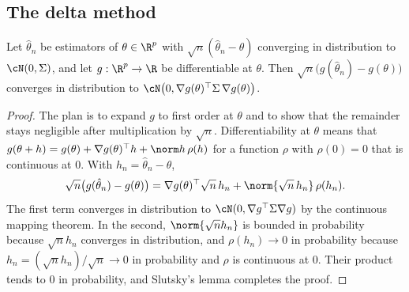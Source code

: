 \begin{refsection}
\section{The delta method}\label{sec:toolkit:delta}

\begin{theorem}\label{thm:toolkit:delta}
Let $\hat\theta_n$ be estimators of $\theta\in\R^p$ with $\sqrt n(\hat\theta_n-\theta)$ converging in distribution to $\cN(0,\Sigma)$, and let $g:\R^p\to\R$ be differentiable at $\theta$. Then $\sqrt n\bigl(g(\hat\theta_n)-g(\theta)\bigr)$ converges in distribution to $\cN\bigl(0,\nabla g(\theta)^\top\Sigma\,\nabla g(\theta)\bigr)$.
\end{theorem}

\begin{proof}
The plan is to expand $g$ to first order at $\theta$ and to show that the remainder stays negligible after multiplication by $\sqrt n$. Differentiability at $\theta$ means that $g(\theta+h)=g(\theta)+\nabla g(\theta)^\top h+\norm h\,\rho(h)$ for a function $\rho$ with $\rho(0)=0$ that is continuous at $0$. With $h_n=\hat\theta_n-\theta$,
\[
\sqrt n\bigl(g(\hat\theta_n)-g(\theta)\bigr)=\nabla g(\theta)^\top\sqrt n\,h_n+\norm{\sqrt n\,h_n}\,\rho(h_n).
\]
The first term converges in distribution to $\cN(0,\nabla g^\top\Sigma\nabla g)$ by the continuous mapping theorem. In the second, $\norm{\sqrt nh_n}$ is bounded in probability because $\sqrt nh_n$ converges in distribution, and $\rho(h_n)\to0$ in probability because $h_n=(\sqrt nh_n)/\sqrt n\to0$ in probability and $\rho$ is continuous at $0$. Their product tends to $0$ in probability, and Slutsky's lemma completes the proof.
\end{proof}


\end{refsection}
